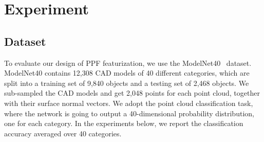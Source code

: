 \documentclass{article}
\begin{document}
\section{Experiment}

\subsection{Dataset}

To evaluate our design of PPF featurization, we use the ModelNet40~\cite{Wu2015-3dshapenet} dataset. ModelNet40 contains 12,308 CAD models of 40 different categories, which are split into a training set of 9,840 objects and a testing set of 2,468 objects. We sub-sampled the CAD models and get 2,048 points for each point cloud, together with their surface normal vectors. We adopt the point cloud classification task, where the network is going to output a 40-dimensional probability distribution, one for each category. In the experiments below, we report the classification accuracy averaged over 40 categories. 
\end{document}

